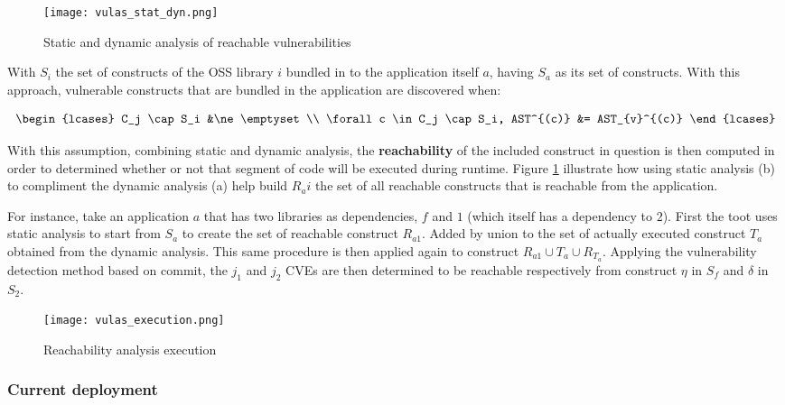 \documentclass[11pt]{article}
\begin{document}
\begin{figure}[!h]
    \centering
    \texttt{[image: vulas\_stat\_dyn.png]}
    \caption{Static and dynamic analysis of reachable vulnerabilities}
    \label{fig:vulas_dynstat}
\end{figure}

With $S_i$ the set of constructs of the OSS library $i$ bundled in to the application itself $a$, having $S_a$ as its set of constructs. With this approach, vulnerable constructs that are bundled in the application are discovered when:

    \begin{equation}
        \begin{lcases}
          C_j \cap S_i &\ne \emptyset \\
          \forall c \in C_j \cap S_i, AST^{(c)} &= AST_{v}^{(c)} 
        \end{lcases}
    \end{equation}
\vspace{4mm}

With this assumption, combining static and dynamic analysis, the \textbf{reachability} of the included construct in question is then computed in order to determined whether or not that segment of code will be executed during runtime. Figure \ref{fig:vulas_dynstat} illustrate how using static analysis (b) to compliment the dynamic analysis (a) help build $R_ai$ the set of all reachable constructs that is reachable from the application. 

For instance, take an application $a$ that has two libraries as dependencies, $f$ and $1$ (which itself has a dependency to $2$). First the toot uses static analysis to start from $S_a$ to create the set of reachable construct $R_{a1}$. Added by union to the set of actually executed construct $T_a$ obtained from the dynamic analysis. This same procedure is then applied again to construct $R_{a1} \cup T_a \cup R_{T_a}$. Applying the vulnerability detection method based on commit, the $j_1$ and $j_2$ CVEs are then determined to be reachable respectively from construct $\eta$ in $S_f$ and $\delta$ in $S_2$. 

\begin{figure}[!h]
    \centering
    \texttt{[image: vulas\_execution.png]}
    \caption{Reachability analysis execution}
    \label{fig:vulas_reach}
\end{figure}

\subsubsection{Current deployment}
\end{document}
